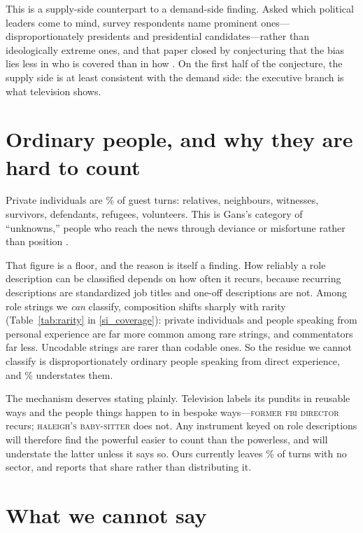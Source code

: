 \documentclass[12pt, letterpaper]{article}
\begin{document}
This is a supply-side counterpart to a demand-side finding. Asked which
political leaders come to mind, survey respondents name prominent
ones---disproportionately presidents and presidential candidates---rather than
ideologically extreme ones, and that paper closed by conjecturing that the bias
lies less in who is covered than in how \citep{sood_recall}. On the first half
of the conjecture, the supply side is at least consistent with the demand side:
the executive branch is what television shows.

\section*{Ordinary people, and why they are hard to count}

Private individuals are \PrivateShare\% of guest turns: relatives, neighbours,
witnesses, survivors, defendants, refugees, volunteers. This is Gans's
category of ``unknowns,'' people who reach the news through deviance or
misfortune rather than position \citep{gans1979}.

That figure is a floor, and the reason is itself a finding. How reliably a role
description can be classified depends on how often it recurs, because recurring
descriptions are standardized job titles and one-off descriptions are not. Among
role strings we \emph{can} classify, composition shifts sharply with rarity
(Table~\ref{tab:rarity} in \ref{si_coverage}): private individuals and people
speaking from personal experience are far more common among rare strings, and
commentators far less. Uncodable strings are rarer than codable ones. So the
residue we cannot classify is disproportionately ordinary people speaking from
direct experience, and \PrivateShare\% understates them.

The mechanism deserves stating plainly. Television labels its pundits in
reusable ways and the people things happen to in bespoke ways---\textsc{former
fbi director} recurs; \textsc{haleigh's baby-sitter} does not. Any instrument
keyed on role descriptions will therefore find the powerful easier to count than
the powerless, and will understate the latter unless it says so. Ours currently
leaves \UnknownShare\% of turns with no sector, and reports that share rather
than distributing it.

\section*{What we cannot say}
\end{document}

